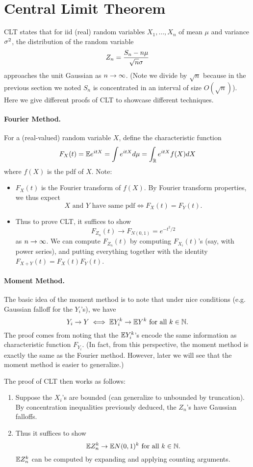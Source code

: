 \section*{Central Limit Theorem}

CLT states that for iid (real) random variables $X_1, \dots, X_n$ of mean $\mu$ and variance $\sigma^2$, the distribution of the random variable
\[
    Z_n = \frac{S_n - n\mu}{\sqrt{n}\sigma}
\]
approaches the unit Gaussian as $n \to \infty$. (Note we divide by $\sqrt{n}$ because in the previous section we noted $S_n$ is concentrated in an interval of size $O(\sqrt{n})$). Here we give different proofs of CLT to showcase different techniques.

\paragraph{Fourier Method.} For a (real-valued) random variable $X$, define the characteristic function
\[
    F_X(t) = {\mathbb E} e^{itX} = \int e^{itX} d\mu = \int_{\mathbb R} e^{itX} f(X) dX
\]
where $f(X)$ is the pdf of $X$. Note:
\begin{itemize}
    \item $F_X(t)$ is the Fourier transform of $f(X)$. By Fourier transform properties, we thus expect
    \[
        \text{$X$ and $Y$ have same pdf} \iff F_X(t) = F_Y(t).
    \]
    \item Thus to prove CLT, it suffices to show
    \[
        F_{Z_n}(t) \to F_{N(0,1)} = e^{-t^2/2}
    \]
    as $n \to \infty$. We can compute $F_{Z_n}(t)$ by computing $F_{X_i}(t)$'s (say, with power series), and putting everything together with the identity $F_{X+Y}(t) = F_{X}(t)F_{Y}(t)$.
\end{itemize}

\paragraph{Moment Method.} The basic idea of the moment method is to note that under nice conditions (e.g. Gaussian falloff for the $Y_i$'s), we have
\[
    Y_i \to Y \iff {\mathbb E} Y_i^k \to {\mathbb E} Y^k \text{ for all } k \in {\mathbb N}.
\]
The proof comes from noting that the ${\mathbb E} Y_i^k$'s encode the same information as characteristic function $F_{Y_i}$. (In fact, from this perspective, the moment method is exactly the same as the Fourier method. However, later we will see that the moment method is easier to generalize.)

The proof of CLT then works as follows:
\begin{enumerate}
    \item Suppose the $X_i$'s are bounded (can generalize to unbounded by truncation). By concentration inequalities previously deduced, the $Z_n$'s have Gaussian falloffs.
    \item Thus it suffices to show
    \[
        {\mathbb E} Z_n^k \to {\mathbb E} N(0,1)^k \text{ for all } k \in {\mathbb N}.
    \]
    ${\mathbb E} Z_n^k$ can be computed by expanding and applying counting arguments.
\end{enumerate}

